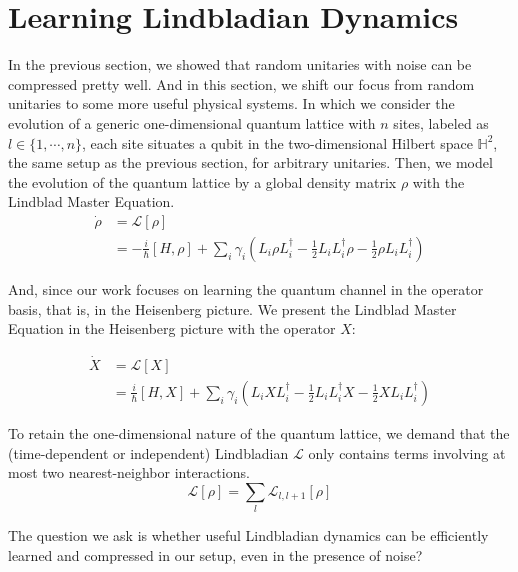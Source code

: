\documentclass[%
 reprint,
superscriptaddress,
 amsmath,amssymb,
 aps,
]{revtex4-2}
\begin{document}
\section{Learning Lindbladian Dynamics}

In the previous section, we showed that random unitaries with noise can be compressed pretty well. And in this section, we shift our focus from random unitaries to some more useful physical systems. In which we consider the evolution of a generic one-dimensional quantum lattice with $n$ sites, labeled as $l\in\{1, \cdots, n\}$, each site situates a qubit in the two-dimensional Hilbert space $\mathbb{H}^2$, the same setup as the previous section, for arbitrary unitaries. Then, we model the evolution of the quantum lattice by a global density matrix $\rho$ with the Lindblad Master Equation.
\begin{equation}
\begin{split}
    \dot{\rho} &= \mathcal{L}[\rho]\\
    &=-\frac{i}{\hbar}[H, \rho]+\sum_{i}\gamma_i\left(L_i\rho L_i^\dagger - \frac{1}{2}L_iL_i^\dagger\rho- \frac{1}{2}\rho L_iL_i^\dagger\right)
\end{split}
\end{equation}

And, since our work focuses on learning the quantum channel in the operator basis, that is, in the Heisenberg picture. We present the Lindblad Master Equation in the Heisenberg picture with the operator $X$:

\begin{equation}
\begin{split}
    \dot{X} &= \mathcal{L}[X]\\
    &=\frac{i}{\hbar}[H, X]+\sum_{i}\gamma_i\left(L_iX L_i^\dagger - \frac{1}{2}L_iL_i^\dagger X- \frac{1}{2}X L_iL_i^\dagger\right)
\end{split}
\end{equation}

To retain the one-dimensional nature of the quantum lattice, we demand that the (time-dependent or independent) Lindbladian $\mathcal{L}$ only contains terms involving at most two nearest-neighbor interactions.
\begin{equation}
    \mathcal{L}[\rho]=\sum_l\mathcal{L}_{l, l+1}[\rho]
\end{equation}

The question we ask is whether useful Lindbladian dynamics can be efficiently learned and compressed in our setup, even in the presence of noise?
\end{document}
